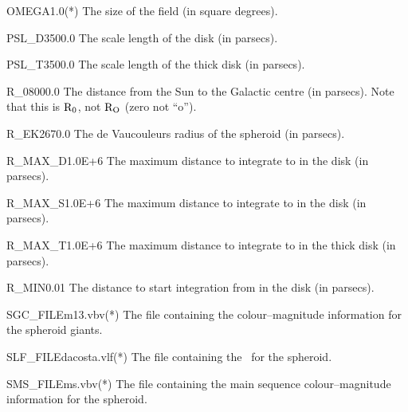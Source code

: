 \documentclass[11pt,twoside]{article}
\begin{document}
\begin{key}{OMEGA}{1.0}{(*)}
The size of the field (in square degrees).
\end{key}

\begin{key}{PSL\_D}{3500.0}{}
The scale length of the disk (in parsecs).
\end{key}

\begin{key}{PSL\_T}{3500.0}{}
The scale length of the thick disk (in parsecs).
\end{key}

\begin{key}{R\_0}{8000.0}{}
The distance from the Sun to the Galactic centre (in parsecs). Note that this 
is ${\rm R}_0$, not ${\rm R}_{\rm O}$ (zero not ``o'').
\end{key}

\begin{key}{R\_EK}{2670.0}{}
The de Vaucouleurs radius of the spheroid (in parsecs).
\end{key}

\begin{key}{R\_MAX\_D}{1.0E+6}{}
The maximum distance to integrate to in the disk (in parsecs).
\end{key}

\begin{key}{R\_MAX\_S}{1.0E+6}{}
The maximum distance to integrate to in the disk (in parsecs).
\end{key}

\begin{key}{R\_MAX\_T}{1.0E+6}{}
The maximum distance to integrate to in the thick disk (in parsecs).
\end{key}

\begin{key}{R\_MIN}{0.01}{}
The distance to start integration from in the disk (in parsecs).
\end{key}

\begin{key}{SGC\_FILE}{m13.vbv}{(*)}
The file containing the colour--magnitude information for the spheroid giants.
\end{key}

\begin{key}{SLF\_FILE}{dacosta.vlf}{(*)}
The file containing the \lf\ for the spheroid.
\end{key}
 
\begin{key}{SMS\_FILE}{ms.vbv}{(*)}
The file containing the main sequence colour--magnitude information for the 
spheroid.
\end{key}
\end{document}
